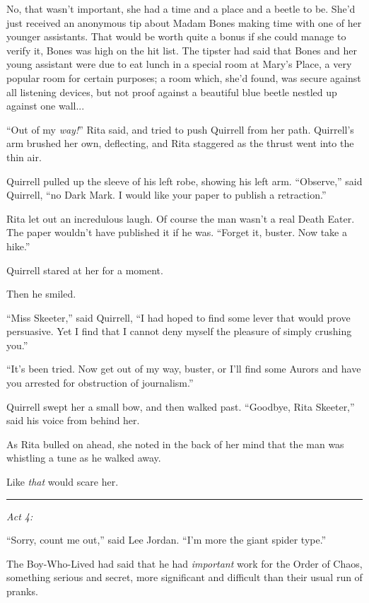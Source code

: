 No, that wasn't important, she had a time and a place and a beetle to be. She'd just received an anonymous tip about Madam Bones making time with one of her younger assistants. That would be worth quite a bonus if she could manage to verify it, Bones was high on the hit list. The tipster had said that Bones and her young assistant were due to eat lunch in a special room at Mary's Place, a very popular room for certain purposes; a room which, she'd found, was secure against all listening devices, but not proof against a beautiful blue beetle nestled up against one wall...

``Out of my \emph{way!}'' Rita said, and tried to push Quirrell from her path. Quirrell's arm brushed her own, deflecting, and Rita staggered as the thrust went into the thin air.

Quirrell pulled up the sleeve of his left robe, showing his left arm. ``Observe,'' said Quirrell, ``no Dark Mark. I would like your paper to publish a retraction.''

Rita let out an incredulous laugh. Of course the man wasn't a real Death Eater. The paper wouldn't have published it if he was. ``Forget it, buster. Now take a hike.''

Quirrell stared at her for a moment.

Then he smiled.

``Miss Skeeter,'' said Quirrell, ``I had hoped to find some lever that would prove persuasive. Yet I find that I cannot deny myself the pleasure of simply crushing you.''

``It's been tried. Now get out of my way, buster, or I'll find some Aurors and have you arrested for obstruction of journalism.''

Quirrell swept her a small bow, and then walked past. ``Goodbye, Rita Skeeter,'' said his voice from behind her.

As Rita bulled on ahead, she noted in the back of her mind that the man was whistling a tune as he walked away.

Like \emph{that} would scare her.

\begin{center}\rule{3in}{0.4pt}\end{center}

\emph{Act 4:}

``Sorry, count me out,'' said Lee Jordan. ``I'm more the giant spider type.''

The Boy-Who-Lived had said that he had \emph{important} work for the Order of Chaos, something serious and secret, more significant and difficult than their usual run of pranks.

